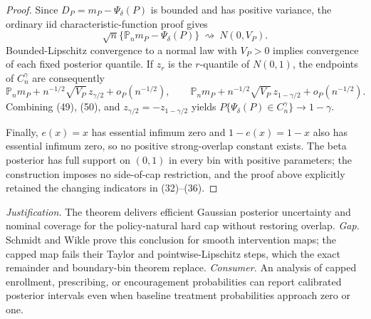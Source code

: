 \documentclass{article}
\begin{document}
\begin{proof}
Since \(D_P=m_P-\Psi_\delta(P)\) is bounded and has positive variance, the ordinary iid characteristic-function proof gives
\begin{equation}
 \sqrt n\{\mathbb P_nm_P-\Psi_\delta(P)\}\ \rightsquigarrow\ N(0,V_P).                \tag{49}
\end{equation}
Bounded-Lipschitz convergence to a normal law with \(V_P>0\) implies convergence of each fixed posterior quantile.  If \(z_r\) is the \(r\)-quantile of \(N(0,1)\), the endpoints of \(C_n^\gamma\) are consequently
\begin{equation}
 \mathbb P_nm_P+n^{-1/2}\sqrt{V_P}\,z_{\gamma/2}+o_P(n^{-1/2}),\qquad
 \mathbb P_nm_P+n^{-1/2}\sqrt{V_P}\,z_{1-\gamma/2}+o_P(n^{-1/2}).                      \tag{50}
\end{equation}
Combining (49), (50), and \(z_{\gamma/2}=-z_{1-\gamma/2}\) yields
\(P\{\Psi_\delta(P)\in C_n^\gamma\}\to1-\gamma\).

Finally, \(e(x)=x\) has essential infimum zero and \(1-e(x)=1-x\) also has essential infimum zero, so no positive strong-overlap constant exists.  The beta posterior has full support on \((0,1)\) in every bin with positive parameters; the construction imposes no side-of-cap restriction, and the proof above explicitly retained the changing indicators in (32)--(36).
\end{proof}
\par\smallskip\noindent \textit{Justification.} The theorem delivers efficient Gaussian posterior uncertainty and nominal coverage for the policy-natural hard cap without restoring overlap. \textit{Gap.} Schmidt and Wikle prove this conclusion for smooth intervention maps; the capped map fails their Taylor and pointwise-Lipschitz steps, which the exact remainder and boundary-bin theorem replace. \textit{Consumer.} An analysis of capped enrollment, prescribing, or encouragement probabilities can report calibrated posterior intervals even when baseline treatment probabilities approach zero or one.
\end{document}
